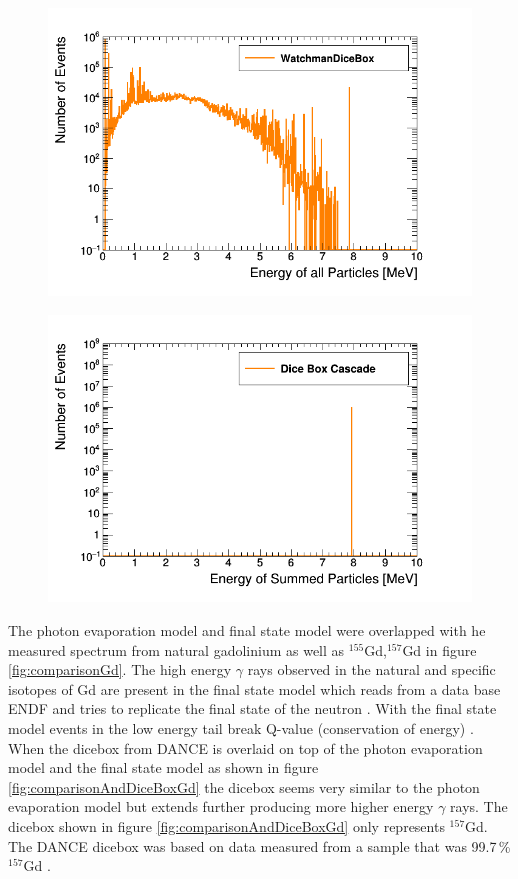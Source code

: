 \begin{figure}[htbp]
 \centering
 \includegraphics[width=0.7\linewidth]{Chapter4/Figs/Raster/gadolinium/energyOfCascadeOfCascadeGd.png}
 \label{fig:energyOfCascadeOfCascadeGd}
\end{figure}

\begin{figure}[htbp]
 \centering
 \includegraphics[width=0.7\linewidth]{Chapter4/Figs/Raster/gadolinium/conservationOfCascadeGd.png}
 \label{fig:conservationOfCascadeGd}
\end{figure}

The photon evaporation model and final state model were overlapped with he measured spectrum from natural gadolinium as well as $^{155}$Gd,$^{157}$Gd in figure \ref{fig:comparisonGd}. The high energy $\gamma$ rays observed in the natural and specific isotopes of Gd are present in the final state model which reads from a data base ENDF and tries to replicate the final state of the neutron \cite{koiTatsumi_2006}. With the final state model events in the low energy tail break Q-value (conservation of energy) \cite{YuChen_2015}. When the dicebox from DANCE is overlaid on top of the photon evaporation model and the final state model as shown in figure  \ref{fig:comparisonAndDiceBoxGd} the dicebox seems very similar to the photon evaporation model but extends further producing more higher energy $\gamma$ rays. The dicebox shown in figure \ref{fig:comparisonAndDiceBoxGd} only represents $^{157}$Gd. The DANCE dicebox was based on data measured from a sample that was  99.7\,\% $^{157}$Gd \cite{Chyzh_2011}. 

